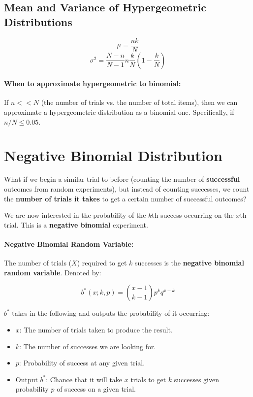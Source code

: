 \documentclass[a4paper,12pt]{report}
\begin{document}
\subsection{Mean and Variance of Hypergeometric Distributions}

$$\mu = \frac{nk}{N}$$
$$\sigma^2 = \frac{N-n}{N-1} n \frac{k}{N} (1-\frac{k}{N})$$

\paragraph{When to approximate hypergeometric to binomial: } If $n << N$ (the number of trials vs. the number of total items), then we can approximate a hypergeometric
distribution as a binomial one. Specifically, if $n/N \leq 0.05$.

\section{Negative Binomial Distribution}

What if we begin a similar trial to before (counting the number of \textbf{successful} outcomes from random experiments), but instead of counting successes, we count the \textbf{number of trials it takes} to get a certain number of successful outcomes?

We are now interested in the probability of the $k$th success occurring on the $x$th trial. This is a \textbf{negative binomial} experiment.

\paragraph{Negative Binomial Random Variable: } The number of trials ($X$) required to get $k$ successes is the \textbf{negative binomial random variable}. Denoted by: 

$$b^*(x; k, p) = \binom{x-1}{k-1}p^kq^{x-k}$$

$b^*$ takes in the following and outputs the probability of it occurring:
\begin{itemize}
\item $x$: The number of trials taken to produce the result.
\item $k$: The number of successes we are looking for.
\item $p$: Probability of success at any given trial.
\item Output $b^*$: Chance that it will take $x$ trials to get $k$ successes given probability $p$ of success on a given trial.
\end{itemize}
\end{document}
